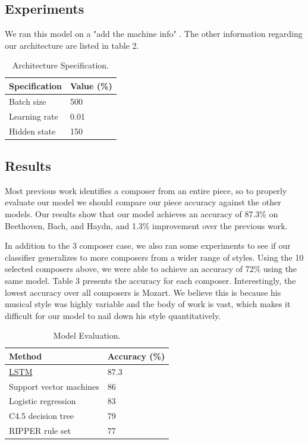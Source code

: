 \documentclass[11pt,a4paper]{article}
\begin{document}
\subsection{Experiments}
We ran this model on a "add the machine info" . The other information regarding our architecture are listed in table 2.

\begin{table}[t!]
\begin{center}
\begin{tabular}{|l|l|}
\hline \bf Specification & \bf Value (\%)\\ \hline
Batch size & 500 \\
Learning rate & 0.01\\
Hidden state & 150\\
\hline
\end{tabular}
\end{center}
\caption{\label{arch-specification-table}Architecture Specification. }
\end{table}
\subsection{Results}
Most previous work identifies a composer from an entire piece, so to properly evaluate our model we should compare our piece accuracy against the other models. Our results show that our model achieves an accuracy of 87.3\% on Beethoven, Bach, and Haydn, and 1.3\% improvement over the previous work. %

In addition to the 3 composer case, we also ran some experiments to see if our classifier generalizes to more composers from a wider range of styles. Using the 10 selected composers above, we were able to achieve an accuracy of 72\% using the same model. Table 3 presents the accuracy for each composer. Interestingly, the lowest accuracy over all composers is Mozart. We believe this is because his musical style was highly variable and the body of work is vast, which makes it difficult for our model to nail down his style quantitatively.

\begin{table}[t!]
\begin{center}
\begin{tabular}{|l|l|}
\hline \bf Method & \bf Accuracy (\%) \\ \hline
\underline{LSTM} & 87.3 \\
Support vector machines & 86 \\
Logistic regression & 83\\
C4.5 decision tree & 79\\
RIPPER rule set & 77\\
\hline
\end{tabular}
\end{center}
\caption{\label{resutls-table} Model Evaluation. }
\end{table}
\end{document}
